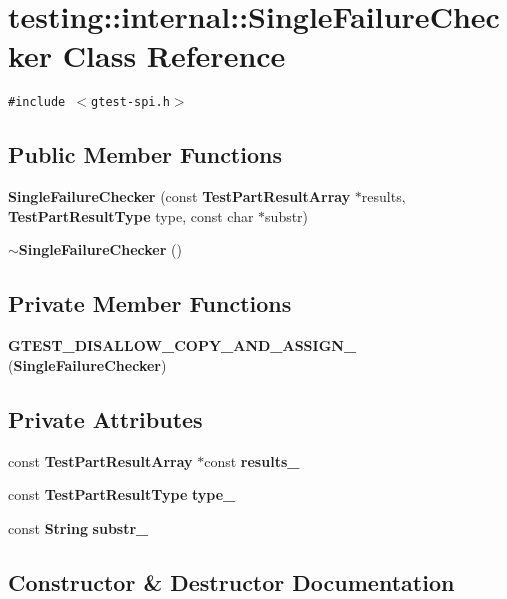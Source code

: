 \section{testing::internal::SingleFailureChecker Class Reference}
\label{classtesting_1_1internal_1_1SingleFailureChecker}
{\tt \#include $<$gtest-spi.h$>$}

\subsection*{Public Member Functions}
\begin{CompactItemize}
\item 
{\bf SingleFailureChecker} (const {\bf TestPartResultArray} $\ast$results, {\bf TestPartResultType} type, const char $\ast$substr)
\item 
{\bf $\sim$SingleFailureChecker} ()
\end{CompactItemize}
\subsection*{Private Member Functions}
\begin{CompactItemize}
\item 
{\bf GTEST\_\-DISALLOW\_\-COPY\_\-AND\_\-ASSIGN\_\-} ({\bf SingleFailureChecker})
\end{CompactItemize}
\subsection*{Private Attributes}
\begin{CompactItemize}
\item 
const {\bf TestPartResultArray} $\ast$const {\bf results\_\-}
\item 
const {\bf TestPartResultType} {\bf type\_\-}
\item 
const {\bf String} {\bf substr\_\-}
\end{CompactItemize}


\subsection{Constructor \& Destructor Documentation}
